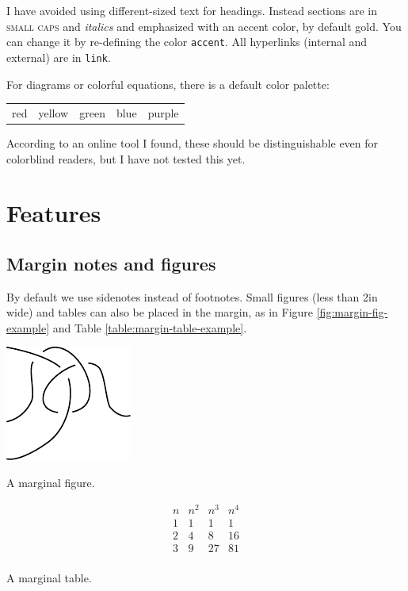 \documentclass[margincite]{sl2art}
\begin{document}
I have avoided using different-sized text for headings.
Instead sections are in {\scshape small caps} and {\itshape italics} and emphasized with an {\color{accent} accent} color, by default gold.
You can change it by re-defining the color {\color{accent} \texttt{accent}}.
All hyperlinks (internal and external) are in {\color{link} \texttt{link}}.%

For diagrams or colorful equations, there is a default color palette:
\begin{center}
  \begin{tabular}{ccccc}
    {\color{slred} red} 
    &
    {\color{slyellow} yellow}
    &
    {\color{slgreen} green}
    &
    {\color{slblue} blue} 
    &
    {\color{slpurple} purple} 
  \end{tabular}
\end{center}
According to an online tool I found, these should be distinguishable even for colorblind readers, but I have not tested this yet.

\section{Features}

\subsection{Margin notes and figures}
By default we use sidenotes instead of footnotes.
Small figures (less than 2in wide) and tables can also be placed in the margin, as in Figure \ref{fig:margin-fig-example} and Table \ref{table:margin-table-example}.
\begin{marginfigure}
  \centering
  \includegraphics{margin-fig-example.pdf}
  \caption{A marginal figure.}
  \label{fig:margin-fig-example}
\end{marginfigure}
\begin{margintable}
  \[
    \begin{array}{c|ccc}
      n & n^2 & n^3 & n^4\\
      \hline
      1 & 1 & 1 & 1\\
      2 & 4 & 8 & 16 \\
      3 & 9 & 27 & 81 \\
    \end{array}
  \]
  \caption{A marginal table.}
  \label{table:margin-table-example}
\end{margintable}
\end{document}

